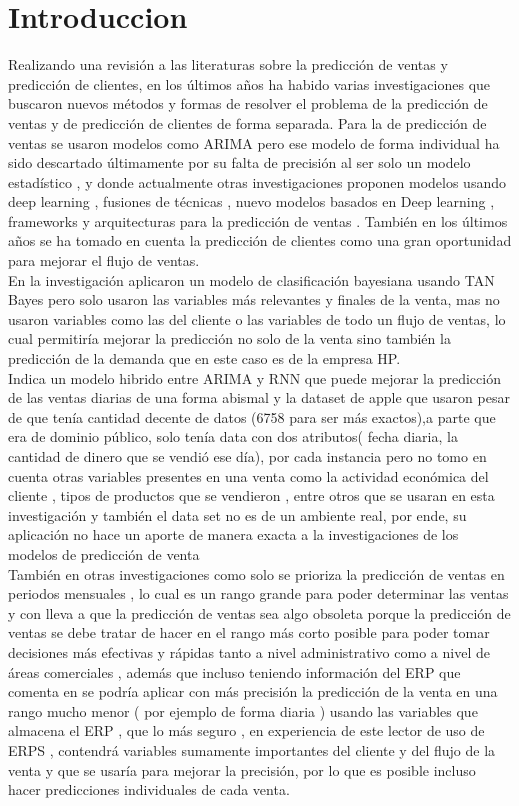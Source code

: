 \documentclass[conference]{IEEEtran}
\begin{document}
\section{Introduccion}
Realizando una revisión a las literaturas sobre la predicción de ventas y predicción de clientes, en los últimos años ha habido varias investigaciones que buscaron nuevos métodos y formas de resolver el problema de la predicción de ventas y de predicción de clientes de forma separada. Para la de predicción de ventas se usaron modelos como ARIMA pero ese modelo de forma individual ha sido descartado últimamente por su falta de precisión al ser solo un modelo estadístico , y donde actualmente otras investigaciones proponen modelos usando deep learning \cite{b1} \cite{b2} , fusiones de técnicas \cite{b3} \cite{b4}, nuevo modelos basados en Deep learning \cite{b5} \cite{b6} \cite{b7}, frameworks \cite{b8} y arquitecturas \cite{b9} para la predicción de ventas . También en los últimos años se ha tomado en cuenta la predicción de clientes \cite{b10} \cite{b11} \cite{b12} \cite{b13} \cite{b14} como una gran oportunidad para mejorar el flujo de ventas.\\
En la investigación \cite{b7} aplicaron un modelo de clasificación bayesiana usando TAN Bayes pero solo usaron las variables más relevantes y finales de la venta, mas no usaron variables como las del cliente o las variables de todo un flujo de ventas, lo cual permitiría mejorar la predicción no solo de la venta sino también la predicción de la demanda que en este caso es de la empresa HP.\\
Indica un modelo hibrido entre ARIMA y RNN\cite{b4} que puede mejorar la predicción de las ventas diarias de una forma abismal y la dataset de apple que usaron pesar de que tenía cantidad decente de datos (6758 para ser más exactos),a parte que era de dominio público, solo tenía data con dos atributos( fecha diaria, la cantidad de dinero que se vendió ese día), por cada instancia pero no tomo en cuenta otras variables presentes en una venta como la actividad económica del cliente , tipos de productos que se vendieron , entre otros que se usaran en esta investigación y también el data set no es de un ambiente real, por ende, su aplicación no hace un aporte de manera exacta a la investigaciones de los modelos de predicción de venta\\
También en otras investigaciones como \cite{b15} solo se prioriza la predicción de ventas en periodos mensuales , lo cual es un rango grande para poder determinar las ventas y con lleva a que la predicción de ventas sea algo obsoleta porque la predicción de ventas se debe tratar de hacer en el rango más corto posible para poder tomar decisiones más efectivas y rápidas tanto a nivel administrativo como a nivel de áreas comerciales , además que incluso teniendo información del ERP que comenta en \cite{b15} se podría aplicar con más precisión la predicción de la venta en una rango mucho menor ( por ejemplo de forma diaria ) usando las variables que almacena el ERP , que lo más seguro , en experiencia de este lector de uso de ERPS , contendrá variables sumamente importantes del cliente y del flujo de la venta y que se usaría para mejorar la precisión, por lo que es posible incluso hacer predicciones individuales de cada venta.\\
\end{document}
